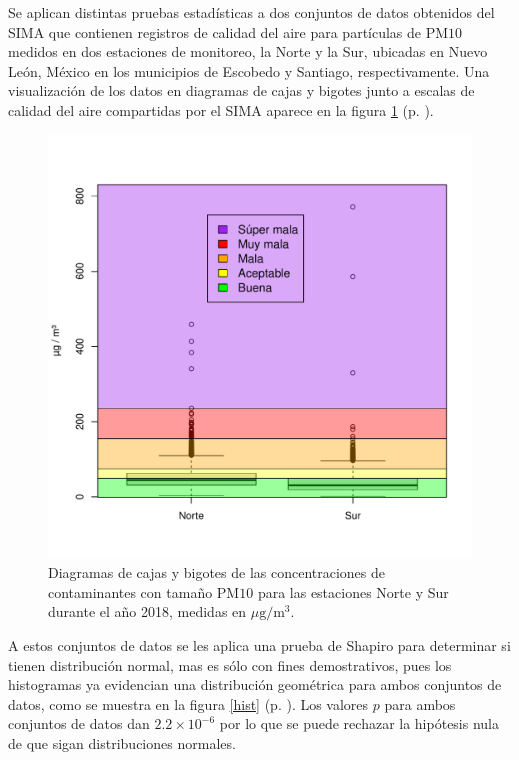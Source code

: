 \documentclass[paper=leter, fontsize=11pt]{scrartcl}
\numberwithin{equation}{section}		%
\numberwithin{figure}{section}			%
\numberwithin{table}{section}				%
\begin{document}
Se aplican distintas pruebas estadísticas a dos conjuntos de datos obtenidos del SIMA \citet{sima} que contienen registros de calidad del aire para partículas de PM$10$ medidos en dos estaciones de monitoreo, la Norte y la Sur, ubicadas en Nuevo León, México en los municipios de Escobedo y Santiago, respectivamente. Una visualización de los datos en diagramas de cajas y bigotes junto a escalas de calidad del aire compartidas por el SIMA aparece en la figura \ref{boxplots} (p. \pageref{boxplots}).

\begin{figure}
    \centering
    \includegraphics[width=1\textwidth]{boxplots.pdf}
    \caption{Diagramas de cajas y bigotes de las concentraciones de contaminantes con tamaño PM$10$ para las estaciones Norte y Sur durante el año 2018, medidas en $\mu\text{g}/\text{m}^3$.}
    \label{boxplots}
\end{figure}

A estos conjuntos de datos se les aplica una prueba de Shapiro para determinar si tienen distribución normal, mas es sólo con fines demostrativos, pues los histogramas ya evidencian una distribución geométrica para ambos conjuntos de datos, como se muestra en la figura \ref{hist} (p. \pageref{hist}). Los valores $p$ para ambos conjuntos de datos dan $2.2 \times 10^{-6}$ por lo que se puede rechazar la hipótesis nula de que sigan distribuciones normales.
\end{document}
